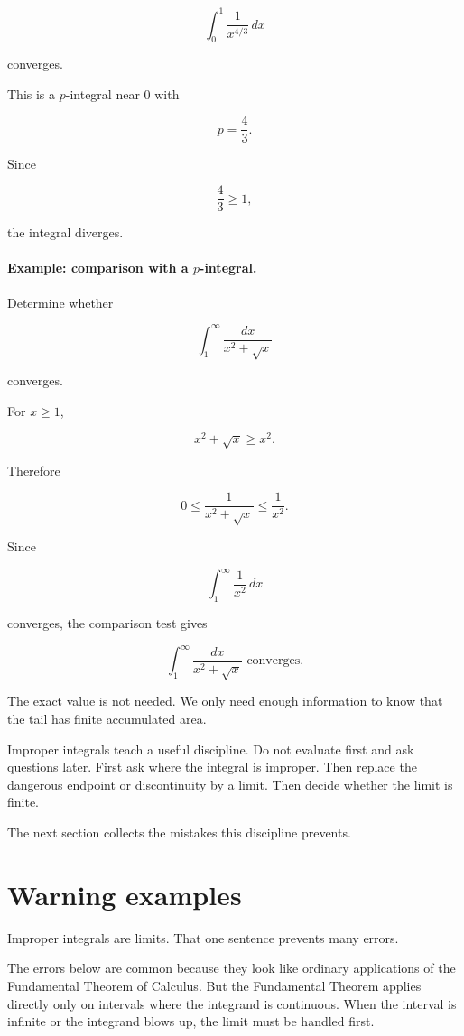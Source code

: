 \[
\int_0^1 \frac{1}{x^{4/3}}\,dx
\]

converges.

This is a \(p\)-integral near \(0\) with

\[
p=\frac43.
\]

Since

\[
\frac43\ge1,
\]

the integral diverges.

\paragraph{Example: comparison with a \(p\)-integral.}
Determine whether

\[
\int_1^\infty \frac{dx}{x^2+\sqrt{x}}
\]

converges.

For \(x\ge1\),

\[
x^2+\sqrt{x}\ge x^2.
\]

Therefore

\[
0\le \frac{1}{x^2+\sqrt{x}}\le \frac1{x^2}.
\]

Since

\[
\int_1^\infty \frac1{x^2}\,dx
\]

converges, the comparison test gives

\[
\boxed{
\int_1^\infty \frac{dx}{x^2+\sqrt{x}}
\text{ converges.}
}
\]

The exact value is not needed.  We only need enough information to know that the
tail has finite accumulated area.

Improper integrals teach a useful discipline.  Do not evaluate first and ask questions
later.  First ask where the integral is improper.  Then replace the dangerous endpoint
or discontinuity by a limit.  Then decide whether the limit is finite.

The next section collects the mistakes this discipline prevents.

\section{Warning examples}
\label{sec:warning-examples-improper-integrals}

Improper integrals are limits.  That one sentence prevents many errors.

The errors below are common because they look like ordinary applications of the
Fundamental Theorem of Calculus.  But the Fundamental Theorem applies directly only
on intervals where the integrand is continuous.  When the interval is infinite or the
integrand blows up, the limit must be handled first.

